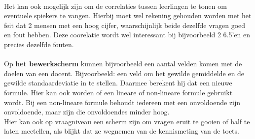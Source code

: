 \documentclass[12pt]{article}
\begin{document}
\begin{multicols}{2}
\\
Het kan ook mogelijk zijn om de correlaties tussen leerlingen te tonen om eventuele spiekers te vangen. Hierbij moet wel rekening gehouden worden met het feit dat 2 mensen met een hoog cijfer, waarschijnlijk beide dezelfde vragen goed en fout hebben. Deze coorelatie wordt wel interessant bij bijvoorbeeld 2 6.5'en en precies dezelfde fouten.\\
\\
Op \textbf{het bewerkscherm} kunnen bijvoorbeeld een aantal velden komen met de doelen van een docent. Bijvoorbeeld: een veld om het gewilde gemiddelde en de gewilde standaardeviatie in te stellen. Daarmee berekent hij dat een nieuwe formule. Hier kan ook worden of een lineare of non-lineare formule gebruikt wordt. Bij een non-lineare formule behoudt iedereen met een onvoldoende zijn onvoldoende, maar zijn die onvoldoendes minder hoog. \\
Hier kan ook op vraagniveau een scherm zijn om vragen eruit te gooien of half te laten meetellen, als blijkt dat ze wegnemen van de kennismeting van de toets.
\end{multicols}
\pagebreak
\end{document}
